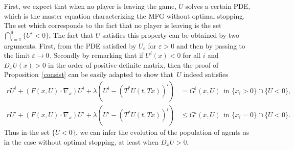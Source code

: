 \documentclass[10pt]{amsart}
\let\epsilon\varepsilon
\theoremstyle{definition}
\begin{document}
First, we expect that when no player is leaving the game, $U$ solves a certain PDE, which is the master equation characterizing the MFG without optimal stopping. The set which corresponds to the fact that no player is leaving is the set $\bigcap_{i =1}^d \{ U^i < 0\}$. The fact that $U$ satisfies this property can be obtained by two arguments. First, from the PDE satisfied by $U_{\epsilon}$ for $\epsilon > 0$ and then by passing to the limit $\epsilon \to 0$. Secondly by remarking that if $U^i(x) < 0$ for all $i$ and $D_xU(x) > 0$ in the order of positive definite matrix, then the proof of Proposition~\ref{consist} can be easily adapted to show that~$U$ indeed satisfies
\begin{align*}
r U^i+(F(x,U)\cdot \nabla_x)U^i+\lambda \left(U^i-(T^*U(t,Tx))^i\right)&= G^i(x,U) \ \ \text{in } \{x_i > 0\}\cap \{ U < 0 \},
\\
r U^i+(F(x,U)\cdot \nabla_x)U^i+\lambda \left(U^i-(T^*U(t,Tx))^i\right)&\leq G^i(x,U) \ \ \text{in } \{x_i =0\} \cap \{ U < 0\}.
\end{align*}
Thus in the set $\{U < 0\}$, we can infer the evolution of the population of agents as in the case without optimal stopping, at least when $D_x U > 0$.
\end{document}
